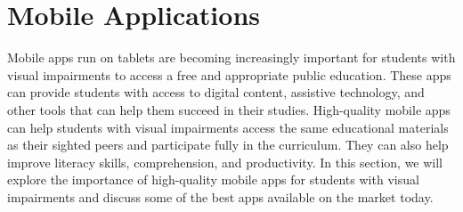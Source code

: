 \documentclass[14pt,letterpaper,twoside]{extreport}
\begin{document}
\pagebreak 
	\hypertarget{tablet-apps}{}\section{Mobile Applications}\label{tablet-apps}
Mobile apps run on tablets are becoming increasingly important for students with visual impairments to access a free and appropriate public education. These apps can provide students with access to digital content, assistive technology, and other tools that can help them succeed in their studies. High-quality mobile apps can help students with visual impairments access the same educational materials as their sighted peers and participate fully in the curriculum. They can also help improve literacy skills, comprehension, and productivity. In this section, we will explore the importance of high-quality mobile apps for students with visual impairments and discuss some of the best apps available on the market today.
\end{document}
